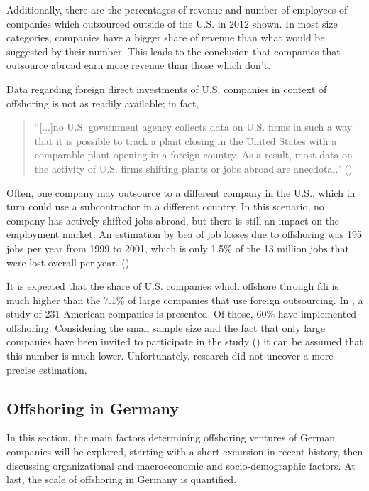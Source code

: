 
Additionally, there are the percentages of revenue and number of employees of companies which outsourced outside of the U.S. in 2012 shown. In most size categories, companies have a bigger share of revenue than what would be suggested by their number. This leads to the conclusion that companies that outsource abroad earn more revenue than those which don't.

Data regarding foreign direct investments of U.S. companies in context of offshoring is not as readily available; in fact, 
\begin{quote}
	``[...]no U.S. government agency collects data on U.S. firms in such a way that it is possible to track a plant closing in the United States with a comparable plant opening in a foreign country. As a result, most data on the activity of U.S. firms shifting plants or jobs abroad are anecdotal.'' (\cite{Jackson.2013})
\end{quote}



Often, one company may outsource to a different company in the U.S., which in turn could use a subcontractor in a different country. In this scenario, no company has actively shifted jobs abroad, but there is still an impact on the employment market. An estimation by \gls{bea} of job losses due to offshoring was 195  jobs per year from 1999 to 2001, which is only 1.5\% of the 13 million jobs that were lost overall per year. (\cite[pp. 14ff]{Kozlow.2006})

It is expected that the share of U.S. companies which offshore through \gls{fdi} is much higher than the 7.1\% of large companies that use foreign outsourcing. In \cite[pp. 167ff]{Hutzschenreuter.2007}, a study of 231 American companies is presented. Of those, 60\% have implemented offshoring. Considering the small sample size and the fact that only large companies have been invited to participate in the study (\cite[pp. 199f]{Hutzschenreuter.2007}) it can be assumed that this number is much lower. Unfortunately, research did not uncover a more precise estimation.

\subsection{Offshoring in Germany}
\label{sec:OffshoringGER}
In this section, the main factors determining offshoring ventures of German companies will be explored, starting with a short excursion in recent history, then discussing organizational and macroeconomic and socio-demographic factors. At last, the scale of offshoring in Germany is quantified.

